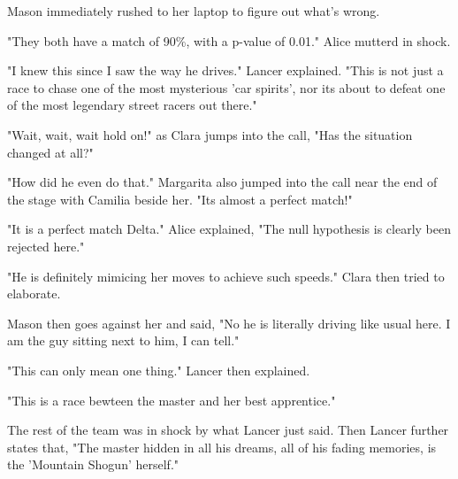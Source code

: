 Mason immediately rushed to her laptop to figure out what's wrong.

"They both have a match of 90\%, with a p-value of 0.01." Alice mutterd in shock.

"I knew this since I saw the way he drives." Lancer explained. "This is not just a race to chase one of the most mysterious 'car spirits', nor its about to defeat one of the most legendary street racers out there."

"Wait, wait, wait hold on!" as Clara jumps into the call, "Has the situation changed at all?"

"How did he even do that." Margarita also jumped into the call near the end of the stage with Camilia beside her. "Its almost a perfect match!"

"It is a perfect match Delta." Alice explained, "The null hypothesis is clearly been rejected here."

"He is definitely mimicing her moves to achieve such speeds." Clara then tried to elaborate.

Mason then goes against her and said, "No he is literally driving like usual here. I am the guy sitting next to him, I can tell."

"This can only mean one thing." Lancer then explained. 

\hfill

"This is a race bewteen the master and her best apprentice."

\hfill

The rest of the team was in shock by what Lancer just said. Then Lancer further states that, "The master hidden in all his dreams, all of his fading memories, is the 'Mountain Shogun' herself."

